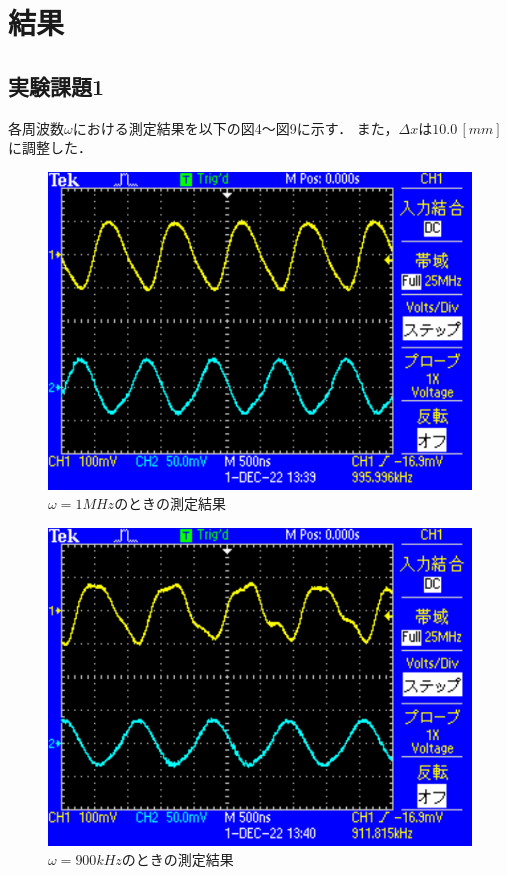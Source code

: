 
\section{結果}

\subsection{実験課題1}
各周波数$\omega$における測定結果を以下の図4～図9に示す．
また，$\Delta x$は$10.0\,[\si{mm}]$に調整した．

\begin{figure}[H]
    \centering
    \includegraphics[scale=0.5]{TEK0001.pdf}
    \caption{$\omega=1\si{MHz}$のときの測定結果}
\end{figure}

\begin{figure}[H]
    \centering
    \includegraphics[scale=0.5]{TEK0002.pdf}
    \caption{$\omega=900\si{kHz}$のときの測定結果}
\end{figure}

